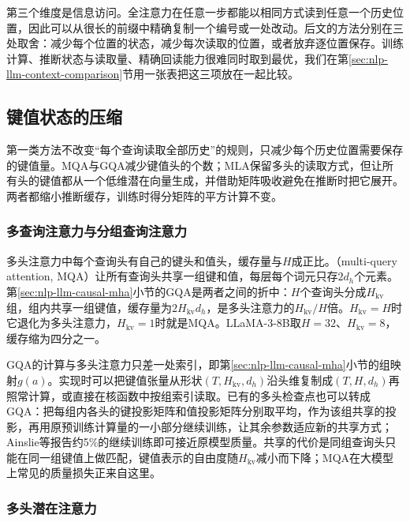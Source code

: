 第三个维度是信息访问。全注意力在任意一步都能以相同方式读到任意一个历史位置，因此可以从很长的前缀中精确复制一个编号或一处改动。后文的方法分别在三处取舍：减少每个位置的状态，减少每次读取的位置，或者放弃逐位置保存。训练计算、推断状态与读取量、精确回读能力很难同时取到最优，我们在第\ref{sec:nlp-llm-context-comparison}节用一张表把这三项放在一起比较。

\subsection{键值状态的压缩}
\label{sec:nlp-llm-kv-compression}

第一类方法不改变“每个查询读取全部历史”的规则，只减少每个历史位置需要保存的键值量。MQA与GQA减少键值头的个数；MLA保留多头的读取方式，但让所有头的键值都从一个低维潜在向量生成，并借助矩阵吸收避免在推断时把它展开。两者都缩小推断缓存，训练时得分矩阵的平方计算不变。

\subsubsection{多查询注意力与分组查询注意力}
\label{sec:nlp-llm-mqa-gqa}

多头注意力中每个查询头有自己的键头和值头，缓存量与$H$成正比。（multi-query attention, MQA）让所有查询头共享一组键和值，每层每个词元只存$2d_h$个元素。第\ref{sec:nlp-llm-causal-mha}小节的GQA是两者之间的折中：$H$个查询头分成$H_{\mathrm{kv}}$组，组内共享一组键值，缓存量为$2H_{\mathrm{kv}}d_h$，是多头注意力的$H_{\mathrm{kv}}/H$倍。$H_{\mathrm{kv}}=H$时它退化为多头注意力，$H_{\mathrm{kv}}=1$时就是MQA。LLaMA-3-8B取$H=32$、$H_{\mathrm{kv}}=8$，缓存缩为四分之一。

GQA的计算与多头注意力只差一处索引，即第\ref{sec:nlp-llm-causal-mha}小节的组映射$g(a)$。实现时可以把键值张量从形状$(T,H_{\mathrm{kv}},d_h)$沿头维复制成$(T,H,d_h)$再照常计算，或直接在核函数中按组索引读取。已有的多头检查点也可以转成GQA：把每组内各头的键投影矩阵和值投影矩阵分别取平均，作为该组共享的投影，再用原预训练计算量的一小部分继续训练，让其余参数适应新的共享方式；Ainslie等报告约5\%的继续训练即可接近原模型质量。共享的代价是同组查询头只能在同一组键值上做匹配，键值表示的自由度随$H_{\mathrm{kv}}$减小而下降；MQA在大模型上常见的质量损失正来自这里。

\subsubsection{多头潜在注意力}
\label{sec:nlp-llm-mla}

